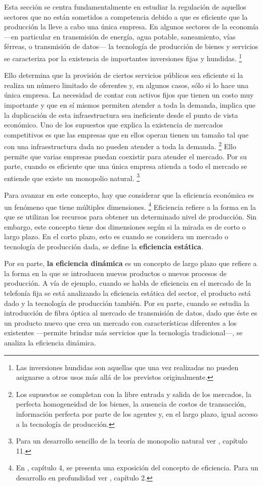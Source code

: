 \documentclass[
  12pt,
  spanish,
]{book}
\begin{document}
Esta sección se centra fundamentalmente en estudiar la regulación de aquellos sectores que no están sometidos a competencia debido a que es eficiente que la producción la lleve a cabo una única empresa. En algunos sectores de la economía ---en particular en transmisión de energía, agua potable, saneamiento, vías férreas, o transmisión de datos--- la tecnología de producción de bienes y servicios se caracteriza por la existencia de importantes inversiones fijas y hundidas.
\footnote{Las inversiones hundidas son aquellas que una vez realizadas no pueden asignarse a otros usos más allá de los previstos originalmente.}

Ello determina que la provisión de ciertos servicios públicos sea eficiente si la realiza un número limitado de oferentes y, en algunos casos, sólo si lo hace una única empresa. La necesidad de contar con activos fijos que tienen un costo muy importante y que en sí mismos permiten atender a toda la demanda, implica que la duplicación de esta infraestructura sea ineficiente desde el punto de vista económico. Uno de los supuestos que explica la existencia de mercados competitivos es que las empresas que en ellos operan tienen un tamaño tal que con una infraestructura dada no pueden atender a toda la demanda.
\footnote{Los supuestos se completan con la libre entrada y salida de los mercados, la perfecta homogeneidad de los bienes, la ausencia de costos de transacción, información perfecta por parte de los agentes y, en el largo plazo, igual acceso a la tecnología de producción.}
Ello permite que varias empresas puedan coexistir para atender el mercado. Por su parte, cuando es eficiente que una única empresa atienda a todo el mercado se entiende que existe un monopolio natural.
\footnote{Para un desarrollo sencillo de la teoría de monopolio natural ver \citet{Viscusi2005}, capítulo 11.}

Para avanzar en este concepto, hay que considerar que la eficiencia económica es un fenómeno que tiene múltiples dimensiones.
\footnote{En \citet{Viscusi2005}, capítulo 4, se presenta una exposición del concepto de eficiencia. Para un desarrollo en profundidad ver \citet{Motta2004}, capítulo 2.}
Eficiencia refiere a la forma en la que se utilizan los recursos para obtener un determinado nivel de producción. Sin embargo, este concepto tiene dos dimensiones según si la mirada es de corto o largo plazo. En el corto plazo, esto es cuando se considera un mercado o tecnología de producción dada, se define la \textbf{eficiencia estática}.

Por su parte, \textbf{la eficiencia dinámica} es un concepto de largo plazo que refiere a la forma en la que se introducen nuevos productos o nuevos procesos de producción. A vía de ejemplo, cuando se habla de eficiencia en el mercado de la telefonía fija se está analizando la eficiencia estática del sector, el producto está dado y la tecnología de producción también. Por su parte, cuando se estudia la introducción de fibra óptica al mercado de transmisión de datos, dado que éste es un producto nuevo que crea un mercado con características diferentes a los existentes ---permite brindar más servicios que la tecnología tradicional---, se analiza la eficiencia dinámica.
\end{document}
